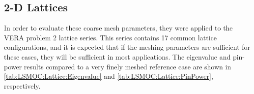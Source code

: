 {{{{        %
      }
    }

    \subsection{2-D Lattices}{\label{ssec:LSMOC:2-D Lattices}
      In order to evaluate these coarse mesh parameters, they were applied to the \ac{VERA} problem 2 lattice series.
      This series contains 17 common lattice configurations, and it is expected that if the meshing parameters are sufficient for these cases, they will be sufficient in most applications.
      The eigenvalue and pin-power results compared to a very finely meshed reference case are shown in \cref{tab:LSMOC:Lattice:Eigenvalue} and \cref{tab:LSMOC:Lattice:PinPower}, respectively.

}}}

